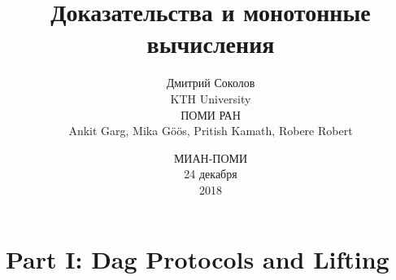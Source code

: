 \documentclass[english, xcolor = {table}]{beamer}
\title[Доказательства и вычисления]{
    Доказательства и монотонные вычисления
}
\author[Соколов Д.]{
    Дмитрий Соколов\\
    KTH University\\
    ПОМИ РАН\\
    \vspace{1cm}
    Ankit Garg, Mika G{\"{o}}{\"{o}}s,  Pritish Kamath, Robere Robert
}
\date{МИАН-ПОМИ\\
	24 декабря\\
	2018
}
\begin{document}
    \maketitle

    \section{Part I: Dag Protocols and Lifting}

    
    
    


\end{document}

